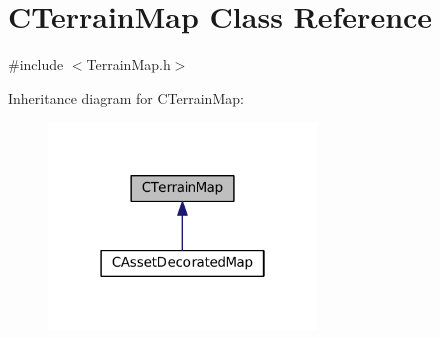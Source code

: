 \hypertarget{classCTerrainMap}{}\section{C\+Terrain\+Map Class Reference}
\label{classCTerrainMap}


{\ttfamily \#include $<$Terrain\+Map.\+h$>$}



Inheritance diagram for C\+Terrain\+Map\+:\nopagebreak
\begin{figure}[H]
\begin{center}
\leavevmode
\includegraphics[width=202pt]{classCTerrainMap__inherit__graph}
\end{center}
\end{figure}
